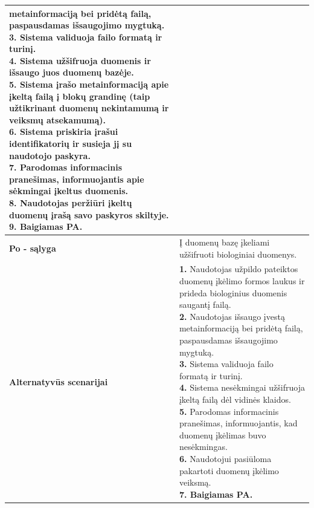 \documentclass[12pt]{article}
\begin{document}
\begin{table}[htb!]
\begin{tabular}{|m{3cm}|m{13.7cm}|}
{{{            metainformaciją bei pridėtą failą, paspausdamas išsaugojimo
            mygtuką.} \\
            \textbf{3.} {Sistema validuoja failo formatą
            ir turinį.} \\
            \textbf{4.} {Sistema užšifruoja duomenis ir
            išsaugo juos duomenų bazėje.} \\
            \textbf{5.} {Sistema įrašo metainformaciją
            apie įkeltą failą į blokų grandinę (taip užtikrinant duomenų
            nekintamumą ir veiksmų atsekamumą).} \\
            \textbf{6.} {Sistema priskiria įrašui
            identifikatorių ir susieja jį su naudotojo paskyra.} \\
            \textbf{7.} {Parodomas informacinis
            pranešimas, informuojantis apie sėkmingai įkeltus duomenis.} \\
            \textbf{8.} \textcolor{dartmouthgreen}{Naudotojas peržiūri įkeltų
            duomenų įrašą savo paskyros skiltyje.} \\
            \textbf{9. Baigiamas PA.}
        }}
        \\
        \hline
        \raggedleft \textbf{\cellcolor{deepchampagne}Po - sąlyga} &
        Į duomenų bazę įkeliami užšifruoti biologiniai duomenys. \\
        \hline
        \raggedleft \textbf{\cellcolor{deepchampagne}Alternatyvūs scenarijai} &
        \vskip 5pt
        \makecell[l]{\parbox[t]{13.7cm}{
            \textbf{1.} \textcolor{dartmouthgreen}{Naudotojas užpildo pateiktos
            duomenų įkėlimo formos laukus ir prideda biologinius duomenis
            saugantį failą.} \\
            \textbf{2.} \textcolor{dartmouthgreen}{Naudotojas išsaugo įvestą
            metainformaciją bei pridėtą failą, paspausdamas išsaugojimo
            mygtuką.} \\
            \textbf{3.} {Sistema validuoja failo formatą
            ir turinį.} \\
            \textbf{4.} {Sistema nesėkmingai užšifruoja
            įkeltą failą dėl vidinės klaidos.} \\
            \textbf{5.} {Parodomas informacinis
            pranešimas, informuojantis, kad duomenų įkėlimas buvo
            nesėkmingas.} \\
            \textbf{6.} {Naudotojui pasiūloma pakartoti
            duomenų įkėlimo veiksmą.} \\
            \textbf{7. Baigiamas PA.}
        }}
        \\
        \hline
    \end{tabular}
\end{table}
\end{document}
